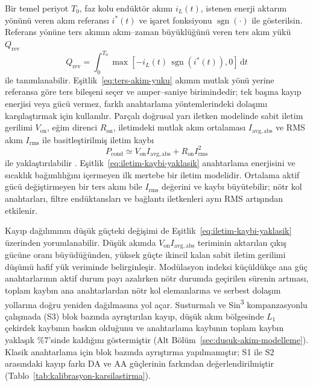 Bir temel periyot $T_0$, faz kolu endüktör akımı $i_L(t)$, istenen enerji aktarım yönünü veren akım referansı $i^{\ast}(t)$ ve işaret fonksiyonu $\operatorname{sgn}(\cdot)$ ile gösterilsin. Referans yönüne ters akımın akım--zaman büyüklüğünü veren ters akım yükü $Q_{\mathrm{rev}}$
\begin{equation}
  Q_{\mathrm{rev}}=\int_0^{T_0}\max\!\left[-i_L(t)\,\operatorname{sgn}\!\left(i^{\ast}(t)\right),0\right]\,\mathrm{d}t
  \label{eq:ters-akim-yuku}
\end{equation}
ile tanımlanabilir. Eşitlik~\eqref{eq:ters-akim-yuku} akımın mutlak yönü yerine referansa göre ters bileşeni seçer ve amper--saniye birimindedir; tek başına kayıp enerjisi veya gücü vermez, farklı anahtarlama yöntemlerindeki dolaşımı karşılaştırmak için kullanılır. Parçalı doğrusal yarı iletken modelinde sabit iletim gerilimi $V_{\mathrm{on}}$, eğim direnci $R_{\mathrm{on}}$, iletimdeki mutlak akım ortalaması $I_{\mathrm{avg,abs}}$ ve RMS akım $I_{\mathrm{rms}}$ ile basitleştirilmiş iletim kaybı
\begin{equation}
  P_{\mathrm{cond}}\simeq V_{\mathrm{on}} I_{\mathrm{avg,abs}}+R_{\mathrm{on}}I_{\mathrm{rms}}^2
  \label{eq:iletim-kaybi-yaklasik}
\end{equation}
ile yaklaştırılabilir \citep{Chen2010,Schweizer2013}. Eşitlik~\eqref{eq:iletim-kaybi-yaklasik} anahtarlama enerjisini ve sıcaklık bağımlılığını içermeyen ilk mertebe bir iletim modelidir. Ortalama aktif gücü değiştirmeyen bir ters akım bile $I_{\mathrm{rms}}$ değerini ve kaybı büyütebilir; nötr kol anahtarları, filtre endüktansları ve bağlantı iletkenleri aynı RMS artışından etkilenir.

Kayıp dağılımının düşük güçteki değişimi de Eşitlik~\eqref{eq:iletim-kaybi-yaklasik} üzerinden yorumlanabilir. Düşük akımda $V_{\mathrm{on}}I_{\mathrm{avg,abs}}$ teriminin aktarılan çıkış gücüne oranı büyüdüğünden, yüksek güçte ikincil kalan sabit iletim gerilimi düşümü hafif yük veriminde belirginleşir. Modülasyon indeksi küçüldükçe ana güç anahtarlarının aktif durum payı azalırken nötr durumda geçirilen sürenin artması, toplam kaybın ana anahtarlardan nötr kol elemanlarına ve serbest dolaşım yollarına doğru yeniden dağılmasına yol açar. Susturmalı ve Sin\textsuperscript{3} kompanzasyonlu çalışmada (S3) blok bazında ayrıştırılan kayıp, düşük akım bölgesinde $L_1$ çekirdek kaybının baskın olduğunu ve anahtarlama kaybının toplam kaybın yaklaşık \%7'sinde kaldığını göstermiştir (Alt Bölüm~\ref{sec:dusuk-akim-modelleme}). Klasik anahtarlama için blok bazında ayrıştırma yapılmamıştır; S1 ile S2 arasındaki kayıp farkı DA ve AA güçlerinin farkından değerlendirilmiştir (Tablo~\ref{tab:kalibrasyon-karsilastirma}).

